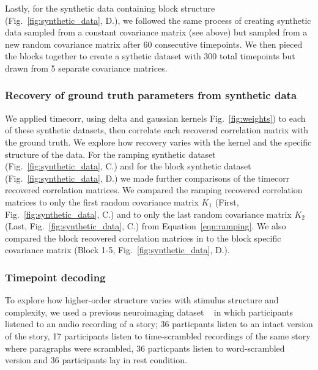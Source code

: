 \documentclass[english]{article}
\begin{document}
Lastly, for the synthetic data containing block structure (Fig.~\ref{fig:synthetic_data},  D.), we followed the same
process of creating synthetic data sampled from a constant covariance
matrix (see above) but sampled from a new random covariance matrix
after 60 consecutive timepoints.  We then pieced the blocks together
to create a sythetic dataset with 300 total timepoints but drawn from
5 separate covariance matrices. 

\subsubsection*{Recovery of ground truth parameters from synthetic
  data}


We applied timecorr, using delta and gaussian kernels
Fig.~\ref{fig:weights}) to each of these 
synthetic datasets, then correlate each recovered
correlation matrix with the ground truth.  We explore how recovery varies
with the kernel and the specific structure of the data. For the
ramping synthetic dataset (Fig.~\ref{fig:synthetic_data},  C.)  and for the
block synthetic dataset (Fig.~\ref{fig:synthetic_data},  D.)  we made further
comparisons of the timecorr recovered correlation matrices. We
compared the ramping recovered correlation matrices to only the first random covariance matrix $K_{1}$
(First, Fig.~\ref{fig:synthetic_data},  C.) and to only the last
random covariance matrix $K_{2}$ (Last, Fig.~\ref{fig:synthetic_data},
C.) from Equation~\ref{eqn:ramping}. We also compared the block recovered correlation matrices in to
the block specific covariance matrix (Block 1-5,
Fig.~\ref{fig:synthetic_data},  D.).


\subsubsection*{Timepoint decoding}

To explore how higher-order structure varies with stimulus structure
and complexity, we used a previous neuroimaging dataset
~\cite{SimoEtal16}  in which participants listened to an audio recording of a story; 36 particpants listen to an intact version of the story, 17 participants listen to time-scrambled recordings of the same story where paragraphs were scrambled, 36 particpants listen to word-scrambled version and 36 participants lay in rest condition.
\end{document}
